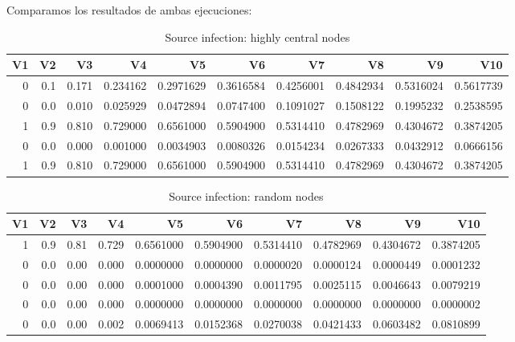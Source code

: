 \documentclass[
]{article}
\begin{document}
Comparamos los resultados de ambas ejecuciones:

\begin{table}[!h]

\caption{\label{tab:unnamed-chunk-4}Source infection: highly central nodes}
\centering
\fontsize{7}{9}\selectfont
\begin{tabular}[t]{rrrrrrrrrr}
\toprule
V1 & V2 & V3 & V4 & V5 & V6 & V7 & V8 & V9 & V10\\
\midrule
0 & 0.1 & 0.171 & 0.234162 & 0.2971629 & 0.3616584 & 0.4256001 & 0.4842934 & 0.5316024 & 0.5617739\\
0 & 0.0 & 0.010 & 0.025929 & 0.0472894 & 0.0747400 & 0.1091027 & 0.1508122 & 0.1995232 & 0.2538595\\
1 & 0.9 & 0.810 & 0.729000 & 0.6561000 & 0.5904900 & 0.5314410 & 0.4782969 & 0.4304672 & 0.3874205\\
0 & 0.0 & 0.000 & 0.001000 & 0.0034903 & 0.0080326 & 0.0154234 & 0.0267333 & 0.0432912 & 0.0666156\\
1 & 0.9 & 0.810 & 0.729000 & 0.6561000 & 0.5904900 & 0.5314410 & 0.4782969 & 0.4304672 & 0.3874205\\
\bottomrule
\end{tabular}
\end{table}

\begin{table}[!h]

\caption{\label{tab:unnamed-chunk-4}Source infection: random nodes}
\centering
\fontsize{7}{9}\selectfont
\begin{tabular}[t]{rrrrrrrrrr}
\toprule
V1 & V2 & V3 & V4 & V5 & V6 & V7 & V8 & V9 & V10\\
\midrule
1 & 0.9 & 0.81 & 0.729 & 0.6561000 & 0.5904900 & 0.5314410 & 0.4782969 & 0.4304672 & 0.3874205\\
0 & 0.0 & 0.00 & 0.000 & 0.0000000 & 0.0000000 & 0.0000020 & 0.0000124 & 0.0000449 & 0.0001232\\
0 & 0.0 & 0.00 & 0.000 & 0.0001000 & 0.0004390 & 0.0011795 & 0.0025115 & 0.0046643 & 0.0079219\\
0 & 0.0 & 0.00 & 0.000 & 0.0000000 & 0.0000000 & 0.0000000 & 0.0000000 & 0.0000000 & 0.0000002\\
0 & 0.0 & 0.00 & 0.002 & 0.0069413 & 0.0152368 & 0.0270038 & 0.0421433 & 0.0603482 & 0.0810899\\
\bottomrule
\end{tabular}
\end{table}
\end{document}
